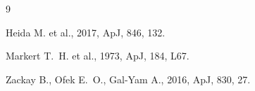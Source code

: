 \documentclass[12pt,a4paper]{article}
\begin{document}
\begin{thebibliography}{9}

  Heida M. et al., 2017, ApJ, 846, 132.

  Markert T.~H. et al., 1973, ApJ, 184, L67.

  Zackay B., Ofek E.~O., Gal-Yam A., 2016, ApJ, 830, 27.

\end{thebibliography}
\end{document}
